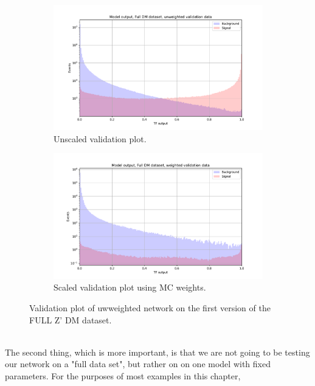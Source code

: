 \documentclass[14pt, a4paper]{book}
\begin{document}
\begin{figure}[!ht]
	\centering
	\begin{subfigure}[b]{0.49\textwidth}
        \centering
        \includegraphics[width=1\textwidth]{OLD_DM_FULL_VAL_UNW.pdf}
        \caption{Unscaled validation plot.}\label{fig:OLD_UNW_FULL_DM_VAL}
     \end{subfigure}
     \hfill
     \begin{subfigure}[b]{0.49\textwidth}
        \centering
        \includegraphics[width=1\textwidth]{OLD_DM_FULL_VAL_W.pdf}
        \caption{Scaled validation plot using MC weights.}\label{fig:OLD_W_FULL_DM_VAL}
     \end{subfigure}
	\caption[Importane of correctly scaling MC events to expected events]{Validation plot of uwweighted network on the first version of the FULL Z' DM dataset.}\label{fig:OLD_FULL_DM_VAL}
\end{figure}
\\The second thing, which is more important, is that we are not going to be testing our network on a "full data set", but rather on on one model with fixed parameters. For the purposes of most examples in this chapter, 
\end{document}
